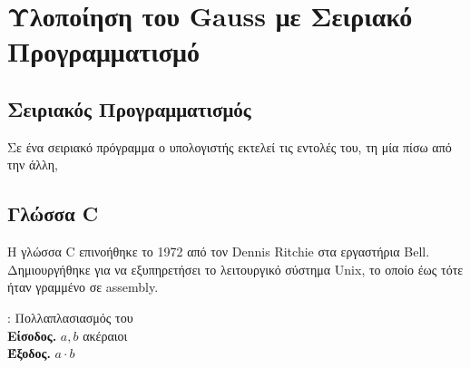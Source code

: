 \section{Υλοποίηση του \lt Gauss με Σειριακό Προγραμματισμό}

\subsection{Σειριακός Προγραμματισμός}    
Σε ένα σειριακό πρόγραμμα ο υπολογιστής εκτελεί τις εντολές του, τη μία πίσω από την άλλη, 
    
   
\subsection{Γλώσσα {\lt C}}
    
Η γλώσσα {\lt C} επινοήθηκε το 1972 από τον {\lt Dennis Ritchie} στα εργαστήρια {\lt Bell}. Δημιουργήθηκε για να εξυπηρετήσει το λειτουργικό σύστημα {\lt Unix}, το οποίο έως τότε ήταν γραμμένο σε {\lt assembly}.

\begin{algorithm}[H]
 \footnotesize {
\begin{algor} : {Πολλαπλασιασμός του }\\
{\bf Είσοδος.} $a,b$ ακέραιοι\\
{\bf Έξοδος.} $a\cdot b$
\end{algor}
{}
              }
\end{algorithm}

\newpage

